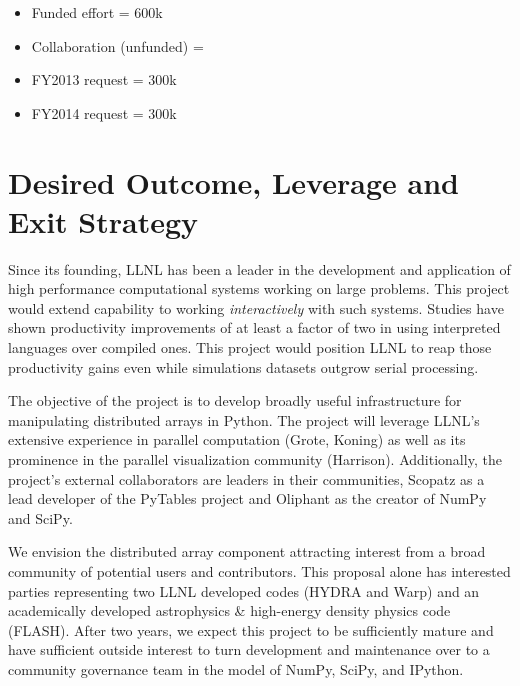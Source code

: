 \documentclass[letterpaper,11pt]{article}
\begin{document}
\begin{itemize}
	\setlength{\itemsep}{0pt}
	\setlength{\parskip}{0pt}
	\setlength{\parsep}{0pt}

	\item Funded effort = 600k
	\item Collaboration (unfunded) =
	\item FY2013 request =  300k
	\item FY2014 request =  300k
\end{itemize}


\section*{Desired Outcome, Leverage and Exit Strategy}

Since its founding, LLNL has been a leader in the development and application of high 
performance computational systems working on large problems.  This project would extend 
capability to working \emph{interactively} with such systems.  Studies have shown productivity 
improvements of at least a factor of two\cite{Prechelt2000} in using interpreted languages 
over compiled ones.  This project would position LLNL to reap those productivity gains even 
while simulations datasets outgrow serial processing.

The objective of the project is to develop broadly useful infrastructure for manipulating 
distributed arrays in Python.  The project will leverage LLNL's extensive experience in 
parallel computation (Grote, Koning) as well as its prominence in the parallel visualization 
community (Harrison).  Additionally, the project's external collaborators are leaders in their 
communities, Scopatz as a lead developer of the PyTables project and Oliphant as the creator of 
NumPy and SciPy.

We envision the distributed array component attracting interest from a broad community 
of potential users and contributors.  This proposal alone has interested parties 
representing two LLNL developed codes (HYDRA and Warp) and an academically developed 
astrophysics \& high-energy density physics code (FLASH).  After two years, we expect this 
project to be sufficiently mature and have sufficient outside interest to turn development 
and maintenance over to a community governance team in the model of NumPy, SciPy, and IPython.

\end{document}
